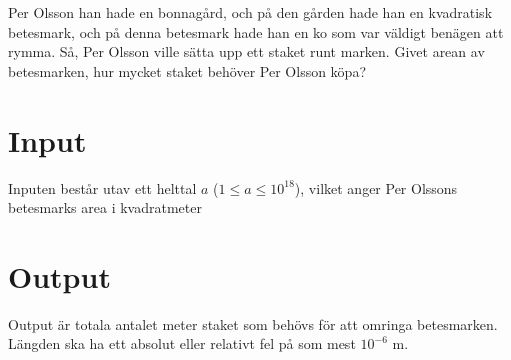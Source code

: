 
%
Per Olsson han hade en bonnagård, och på den gården hade han en kvadratisk
betesmark, och på denna betesmark hade han en ko som var väldigt benägen
att rymma. Så, Per Olsson ville sätta upp ett staket runt marken.
Givet arean av betesmarken, hur mycket staket behöver Per Olsson
köpa?

\section*{Input}

Inputen består utav ett helttal $a$ ($1 \le a \le 10^{18}$), vilket anger Per Olssons
betesmarks area i kvadratmeter

\section*{Output}

Output är totala antalet meter staket som behövs för att omringa betesmarken.
Längden ska ha ett absolut eller relativt fel på som mest $10^{-6}$ m.
